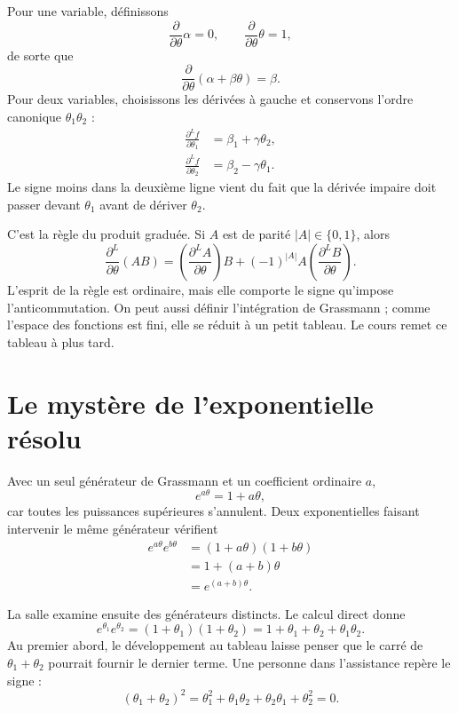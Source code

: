 Pour une variable, définissons
\begin{equation}
\frac{\partial}{\partial\theta}\alpha=0,
\qquad
\frac{\partial}{\partial\theta}\theta=1,
\end{equation}
de sorte que
\begin{equation}
\frac{\partial}{\partial\theta}
(\alpha+\beta\theta)=\beta.
\end{equation}
Pour deux variables, choisissons les dérivées à gauche et conservons l’ordre canonique \(\theta_1\theta_2\) :
\begin{align}
\frac{\partial^L f}{\partial\theta_1}
&=\beta_1+\gamma\theta_2,\\
\frac{\partial^L f}{\partial\theta_2}
&=\beta_2-\gamma\theta_1.
\end{align}
Le signe moins dans la deuxième ligne vient du fait que la dérivée impaire doit passer devant \(\theta_1\) avant de dériver \(\theta_2\).

C’est la règle du produit graduée. Si \(A\) est de parité \(|A|\in\{0,1\}\), alors
\begin{equation}
\frac{\partial^L}{\partial\theta}(AB)
=\left(\frac{\partial^L A}{\partial\theta}\right)B
+(-1)^{|A|}A
\left(\frac{\partial^L B}{\partial\theta}\right).
\end{equation}
L’esprit de la règle est ordinaire, mais elle comporte le signe qu’impose l’anticommutation. On peut aussi définir l’intégration de Grassmann ; comme l’espace des fonctions est fini, elle se réduit à un petit tableau. Le cours remet ce tableau à plus tard.

\section{Le mystère de l’exponentielle résolu}

Avec un seul générateur de Grassmann et un coefficient ordinaire \(a\),
\begin{equation}
e^{a\theta}
=1+a\theta,
\end{equation}
car toutes les puissances supérieures s’annulent. Deux exponentielles faisant intervenir le même générateur vérifient
\begin{align}
e^{a\theta}e^{b\theta}
&=(1+a\theta)(1+b\theta)\\
&=1+(a+b)\theta\\
&=e^{(a+b)\theta}.
\end{align}

La salle examine ensuite des générateurs distincts. Le calcul direct donne
\begin{equation}
e^{\theta_1}e^{\theta_2}
=(1+\theta_1)(1+\theta_2)
=1+\theta_1+\theta_2+\theta_1\theta_2.
\end{equation}
Au premier abord, le développement au tableau laisse penser que le carré de \(\theta_1+\theta_2\) pourrait fournir le dernier terme. Une personne dans l’assistance repère le signe :
\begin{equation}
(\theta_1+\theta_2)^2
=\theta_1^2+\theta_1\theta_2
 +\theta_2\theta_1+\theta_2^2
=0.
\end{equation}

